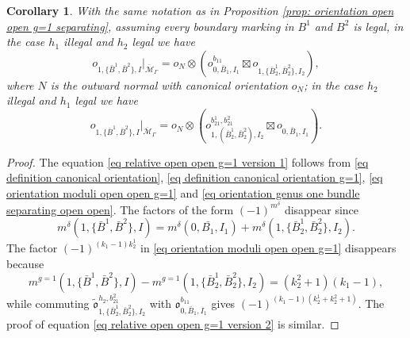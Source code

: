 \documentclass[11pt,a4paper]{article}
\newtheorem{cor}[dummy]{Corollary}
\theoremstyle{definition}
\theoremstyle{remark}
\numberwithin{equation}{section}
\def\Mbar{{\overline{\mathcal M}}}
\begin{document}
\begin{cor}\label{cor:orientation open open g=1}
    With the same notation as in Proposition \ref{prop: orientation open open g=1 separating}, assuming every boundary marking in $B^1$ and $B^2$ is legal, in the case $h_1$ illegal and $h_2$ legal we have 
    \begin{equation}\label{eq relative open open g=1 version 1}
        {{o}}_{1,\{\bar{B}^1,\bar{B}^2\},I}\big |_{\Mbar_\Gamma^{}}=o_N\otimes\left(
         {{o}}^{b_{11}}_{0,\bar B_1,I_1}\boxtimes{{o}}^{}_{1,\{\bar{B}_2^1,\bar{B}_2^2\},I_2}\right),
         \end{equation}
         where $N$ is the outward normal with canonical orientation $o_N$; in the case $h_2$ illegal and $h_1$ legal we have 
         \begin{equation}\label{eq relative open open g=1 version 2}
        {{o}}_{1,\{\bar{B}^1,\bar{B}^2\},I}\big |_{\Mbar_\Gamma^{}}=o_N\otimes\left( {{o}}^{b_{21}^1, b_{21}^2}_{1,(\bar{B}_2^1,\bar{B}_2^2),I_2} \boxtimes{{o}}^{}_{0,\bar B_1,I_1}
           \right).
         \end{equation}
\end{cor}
\begin{proof}
    The equation \eqref{eq relative open open g=1 version 1}  follows from \eqref{eq definition canonical orientation}, \eqref{eq definition canonical orientation g=1}, \eqref{eq orientation moduli open open g=1} and \eqref{eq orientation genus one bundle separating open open}.  The factors of the form $(-1)^{m^\delta}$ disappear since
    $$
        m^\delta(1,\{\bar{B}^1,\bar{B}^2\},I)=m^\delta(0,\bar{B_1},I_1)+m^\delta(1,\{\bar{B}_2^1,\bar{B}_2^2\},I_2).
    $$
    The factor $(-1)^{(k_1-1)k_2^1}$ in \eqref{eq orientation moduli open open g=1} disappears because 
    $$m^{g=1}(1,\{\bar{B}^1,\bar{B}^2\},I)-m^{g=1}(1,\{\bar{B}_2^1,\bar{B}_2^2\},I_2)=(k_2^2+1)(k_1-1),$$
    while commuting $\tilde{\mathfrak{o}}^{h_2, b_{21}^2}_{1,\{\bar{B}_2^1,\bar{B}_2^2\},I_2}$ with ${\mathfrak{o}}^{b_{11}}_{0,\bar B_1,I_1}$ gives $(-1)^{(k_1-1)(k_2^1+k_2^2+1)}$. The proof of equation \eqref{eq relative open open g=1 version 2} is similar.
\end{proof}
\end{document}
